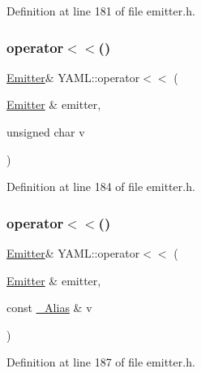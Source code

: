 Definition at line 181 of file emitter.\+h.

\mbox{\label{namespace_y_a_m_l_ab5da6ea293f8ce1ed4c0c8c0f131ea53}} 
\subsubsection{\texorpdfstring{operator$<$$<$()}{operator<<()}\hspace{0.1cm}{\footnotesize\ttfamily [15/35]}}
{\footnotesize\ttfamily \mbox{\hyperlink{class_y_a_m_l_1_1_emitter}{Emitter}}\& Y\+A\+M\+L\+::operator$<$$<$ (\begin{DoxyParamCaption}\item[{\mbox{\hyperlink{class_y_a_m_l_1_1_emitter}{Emitter}} \&}]{emitter,  }\item[{unsigned char}]{v }\end{DoxyParamCaption})\hspace{0.3cm}{\ttfamily [inline]}}



Definition at line 184 of file emitter.\+h.

\mbox{\label{namespace_y_a_m_l_a0cf2ac1f6a1ee0e345dd5526ed498d0e}} 
\subsubsection{\texorpdfstring{operator$<$$<$()}{operator<<()}\hspace{0.1cm}{\footnotesize\ttfamily [16/35]}}
{\footnotesize\ttfamily \mbox{\hyperlink{class_y_a_m_l_1_1_emitter}{Emitter}}\& Y\+A\+M\+L\+::operator$<$$<$ (\begin{DoxyParamCaption}\item[{\mbox{\hyperlink{class_y_a_m_l_1_1_emitter}{Emitter}} \&}]{emitter,  }\item[{const \mbox{\hyperlink{struct_y_a_m_l_1_1___alias}{\+\_\+\+Alias}} \&}]{v }\end{DoxyParamCaption})\hspace{0.3cm}{\ttfamily [inline]}}



Definition at line 187 of file emitter.\+h.

\mbox{\label{namespace_y_a_m_l_ad124dac9a7117bd27b7df70ccce95742}} 
